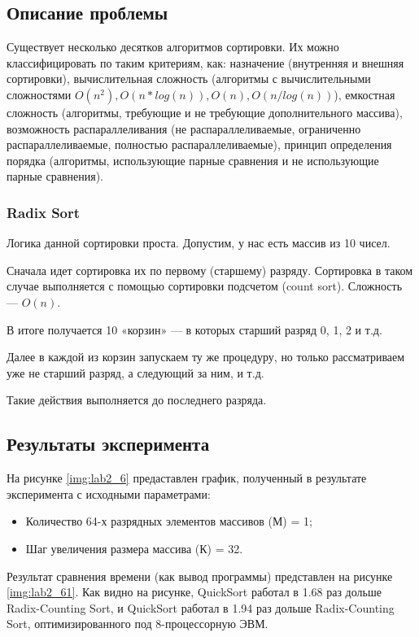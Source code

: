\subsection*{Описание проблемы}
Существует несколько десятков алгоритмов сортировки. Их можно классифицировать по таким критериям, как: назначение (внутренняя и внешняя сортировки), вычислительная сложность (алгоритмы с вычислительными сложностями $O(n^2), O(n*log(n)), O(n), O(n/log(n))$), емкостная сложность (алгоритмы, требующие и не требующие дополнительного массива), возможность распараллеливания (не распараллеливаемые, ограниченно распараллеливаемые, полностью распараллеливаемые), принцип определения порядка (алгоритмы, использующие парные сравнения и не использующие парные сравнения).  

\subsubsection{Radix Sort}

Логика данной сортировки проста. Допустим, у нас есть массив из 10 чисел.

Сначала идет сортировка их по первому (старшему) разряду. Сортировка в таком случае выполняется с помощью сортировки подсчетом (count sort). Сложность — $O(n)$. 

В итоге получается 10 «корзин» — в которых старший разряд 0, 1, 2 и т.д.

Далее в каждой из корзин запускаем ту же процедуру, но только рассматриваем уже не старший разряд, а следующий за ним, и т.д.

Такие действия выполняется до последнего разряда.

\subsection*{Результаты эксперимента}
На рисунке \ref{img:lab2_6} предаставлен график, полученный в результате эксперимента с исходными параметрами:
\begin{itemize}
	\item Количество 64-х разрядных элементов массивов (М) = 1;
	\item Шаг увеличения размера массива (К) = 32.
\end{itemize}


Результат сравнения времени (как вывод программы) представлен на рисунке \ref{img:lab2_61}. Как видно на рисунке, QuickSort работал в 1.68 раз дольше Radix-Counting Sort, и QuickSort работал в 1.94 раз дольше Radix-Counting Sort, оптимизированного под 8-процессорную ЭВМ.

